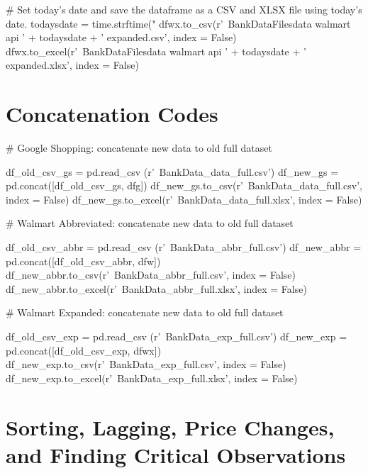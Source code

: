 \begin{python}
# Set today's date and save the dataframe as a CSV and XLSX file using today's date.
todaysdate = time.strftime("%
dfwx.to_csv(r'~\World Bank\Data\Walmart Data\CSV Files\PPP data walmart api ' + 
           todaysdate + ' expanded.csv', index = False)
dfwx.to_excel(r'~\World Bank\Data\Walmart Data\Excel Files\PPP data walmart api ' + 
           todaysdate + ' expanded.xlsx', index = False)
\end{python}



\section{Concatenation Codes}
\label{appendixD}
\begin{python}
# Google Shopping: concatenate new data to old full dataset

df_old_csv_gs = pd.read_csv (r'~\World Bank\Data\Google Data\google_data_full.csv')
df_new_gs = pd.concat([df_old_csv_gs, dfg])
df_new_gs.to_csv(r'~\World Bank\Data\Google Data\google_data_full.csv', index = False)
df_new_gs.to_excel(r'~\World Bank\Data\Google Data\google_data_full.xlsx', index = False)

# Walmart Abbreviated: concatenate new data to old full dataset

df_old_csv_abbr = pd.read_csv (r'~\World Bank\Data\Walmart Data\walmart_abbr_full.csv')
df_new_abbr = pd.concat([df_old_csv_abbr, dfw])
df_new_abbr.to_csv(r'~\World Bank\Data\Walmart Data\walmart_abbr_full.csv', index = False)
df_new_abbr.to_excel(r'~\World Bank\Data\Walmart Data\walmart_abbr_full.xlsx', index = False)

# Walmart Expanded: concatenate new data to old full dataset

df_old_csv_exp = pd.read_csv (r'~\World Bank\Data\Walmart Data\walmart_exp_full.csv')
df_new_exp = pd.concat([df_old_csv_exp, dfwx])
df_new_exp.to_csv(r'~\World Bank\Data\Walmart Data\walmart_exp_full.csv', index = False)
df_new_exp.to_excel(r'~\World Bank\Data\Walmart Data\walmart_exp_full.xlsx', index = False)
\end{python}

\section{Sorting, Lagging, Price Changes, and Finding Critical Observations}
\label{appendixE}

